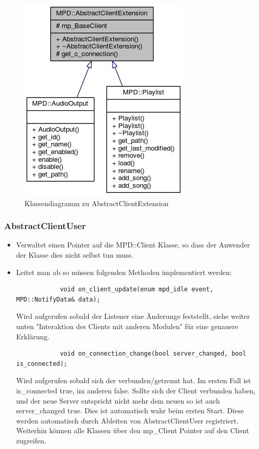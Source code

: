 \begin{figure}[htb!]
	\centering
        \includegraphics[scale=0.6]{AbstractClientExtension.png}
	\caption{Klassendiagramm zu AbstractClientExtension}
	\label{c_abstract_client_extension}
\end{figure}


\subsubsection{AbstractClientUser}
\begin{itemize}
    \item Verwaltet einen Pointer auf die MPD::Client Klasse,
        so dass der Anwender der Klasse dies nicht selbst tun muss.
    \item Leitet man ab so müssen folgenden Methoden implementiert werden:
        \begin{verbatim}
            void on_client_update(enum mpd_idle event, MPD::NotifyData& data);
        \end{verbatim}  

        Wird aufgerufen sobald der Listener eine Änderunge feststellt,
        siehe weiter unten "Interaktion des Clients mit anderen Modulen" für eine genauere Erklärung.
        \begin{verbatim}
            void on_connection_change(bool server_changed, bool is_connected);
        \end{verbatim}

        Wird aufgerufen sobald sich der verbunden/getrennt hat. Im ersten Fall
        ist is\_connected true, im anderen false. Sollte sich der Client verbunden haben,
        und der neue Server entspricht nicht mehr dem neuen so ist auch server\_changed true.
        Dies ist automatisch wahr beim ersten Start.
        Diese werden automatisch durch Ableiten von AbstractClientUser registriert.
        Weiterhin können alle Klassen über den mp\_Client Pointer auf den Client zugreifen.
\end{itemize}


